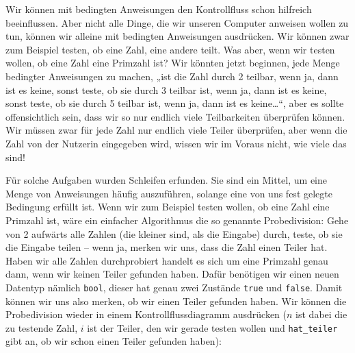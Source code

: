 
Wir können mit bedingten Anweisungen den Kontrollfluss schon hilfreich
beeinflussen. Aber nicht alle Dinge, die wir unseren Computer anweisen wollen
zu tun, können wir alleine mit bedingten Anweisungen ausdrücken. Wir können
zwar zum Beispiel testen, ob eine Zahl, eine andere teilt. Was aber, wenn wir
testen wollen, ob eine Zahl eine Primzahl ist? Wir könnten jetzt beginnen, jede
Menge bedingter Anweisungen zu machen, „ist die Zahl durch 2 teilbar, wenn ja,
dann ist es keine, sonst teste, ob sie durch 3 teilbar ist, wenn ja, dann ist
es keine, sonst teste, ob sie durch 5 teilbar ist, wenn ja, dann ist es
keine\dots“, aber es sollte offensichtlich sein, dass wir so nur endlich viele
Teilbarkeiten überprüfen können. Wir müssen zwar für jede Zahl nur endlich
viele Teiler überprüfen, aber wenn die Zahl von der Nutzerin eingegeben wird,
wissen wir im Voraus nicht, wie viele das sind!

Für solche Aufgaben wurden Schleifen erfunden. Sie sind ein Mittel, um eine
Menge von Anweisungen häufig auszuführen, solange eine von uns fest gelegte
Bedingung erfüllt ist. Wenn wir zum Beispiel testen wollen, ob eine Zahl eine
Primzahl ist, wäre ein einfacher Algorithmus die so genannte Probedivision:
Gehe von 2 aufwärts alle Zahlen (die kleiner sind, als die Eingabe) durch,
teste, ob sie die Eingabe teilen -- wenn ja, merken wir uns, dass die Zahl
einen Teiler hat. Haben wir alle Zahlen durchprobiert handelt es sich um
eine Primzahl genau dann, wenn wir keinen Teiler gefunden haben. Dafür
benötigen wir einen neuen Datentyp nämlich \texttt{bool}, dieser hat genau
zwei Zustände \texttt{true} und \texttt{false}. Damit können wir uns also
merken, ob wir einen Teiler gefunden haben. Wir können die Probedivision wieder in einem Kontrollflussdiagramm ausdrücken ($n$ ist dabei die zu testende Zahl, $i$
ist der Teiler, den wir gerade testen wollen und \texttt{hat\_teiler} gibt
an, ob wir schon einen Teiler gefunden haben):

